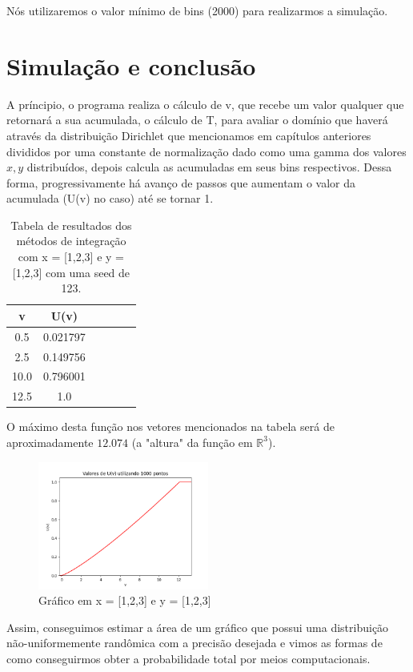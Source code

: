 \documentclass[a4paper]{article}
\begin{document}
Nós utilizaremos o valor mínimo de bins (2000) para realizarmos a simulação.

\section{Simulação e conclusão}

A príncipio, o programa realiza o cálculo de v, que recebe um valor qualquer que retornará a sua acumulada, o cálculo de T, para avaliar o domínio que haverá através da distribuição Dirichlet que mencionamos em capítulos anteriores divididos por uma constante de normalização dado como uma gamma dos valores $x, y$ distribuídos, depois calcula as acumuladas em seus bins respectivos. Dessa forma, progressivamente há avanço de passos que aumentam o valor da acumulada (U(v) no caso) até se tornar 1.

\begin{table}[h]
\centering
\begin{tabular}{|c|c|c|c|c|c|}
\hline
v & U(v)  \\
\hline
0.5 & 0.021797 \\
\hline
2.5 & 0.149756 \\
\hline
10.0 & 0.796001 \\
\hline
12.5 & 1.0 \\
\hline
\end{tabular}
\caption{Tabela de resultados dos métodos de integração com x = [1,2,3] e y = [1,2,3] com uma seed de 123.}
\label{tab:resultados}
\end{table}

O máximo desta função nos vetores mencionados na tabela será de aproximadamente $12.074$ (a "altura" da função em $\mathbb{R}^3$).

\begin{figure}[H]
  \centering
  \includegraphics[width=0.5\textwidth]{Acumulada.png}
  \caption{Gráfico em x = [1,2,3] e y = [1,2,3]}
  \label{fig:HxU}
\end{figure}

Assim, conseguimos estimar a área de um gráfico que possui uma distribuição não-uniformemente randômica com a precisão desejada e vimos as formas de como conseguirmos obter a probabilidade total por meios computacionais.
\end{document}
